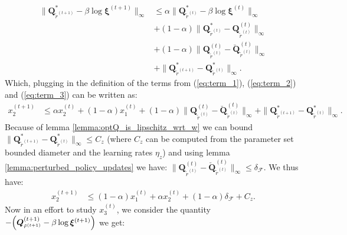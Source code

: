 \begin{align*}
    \| \bm{Q}_{\tilde{r}^{(t+1)}}^* - \beta \log \bm{\xi}^{(t+1)} \|_\infty
    & \leq \alpha  \| \bm{Q}_{\tilde{r}^{(t)}}^* - \beta \log \bm{\xi}^{(t)} \|_\infty 
    \\
    &+ (1-\alpha) \|
    \bm{Q}_{\tilde{r}^{(t)}}^*  
    - {\bm{Q}}^{(t)}_{\tilde{r}^{(t)}} 
    \|_\infty  
    \\ 
    &+ (1-\alpha) \|
        {\bm{Q}}^{(t)}_{\tilde{r}^{(t)}} 
        - \breve{\bm{Q}}^{(t)}_{\tilde{r}^{(t)}} 
    \|_\infty 
    \\
    &+ \| 
        \bm{Q}_{\tilde{r}^{(t+1)}}^*  
        - \bm{Q}_{\tilde{r}^{(t)}}^*  
    \|_\infty.
\end{align*}
Which, plugging in the definition of the terms from (\ref{eq:term_1}), (\ref{eq:term_2}) and (\ref{eq:term_3}) can be written as:
\begin{align*}
    x_2^{(t+1)} 
    & \leq \alpha x_2^{(t)}  
    + (1-\alpha) x_1^{(t)}
    + (1-\alpha) \|
        {\bm{Q}}^{(t)}_{\tilde{r}^{(t)}} 
        - \breve{\bm{Q}}^{(t)}_{\tilde{r}^{(t)}} 
    \|_\infty 
    + \| 
        \bm{Q}_{\tilde{r}^{(t+1)}}^*  
        - \bm{Q}_{\tilde{r}^{(t)}}^*  
    \|_\infty.
\end{align*}
Because of lemma \ref{lemma:optQ_is_lipschitz_wrt_w} we can bound $\| \bm{Q}_{\tilde{r}^{(t+1)}}^*- \bm{Q}_{\tilde{r}^{(t)}}^* \|_\infty \leq C_z$ (where $C_z$ can be computed from the parameter set bounded diameter and the learning rates $\eta_z$) and using lemma \ref{lemma:perturbed_policy_updates} we have: $\|{\bm{Q}}^{(t)}_{\tilde{r}^{(t)}} - \breve{\bm{Q}}^{(t)}_{\tilde{r}^{(t)}} \|_\infty \leq \delta_\mathcal{F}$. We thus have:
\begin{equation}
    \begin{aligned}
        \label{eq:ineq_opt_aux}
        x_2^{(t+1)} 
        & \leq (1-\alpha) x_1^{(t)} + \alpha x_2^{(t)}  
        + (1-\alpha) \delta_\mathcal{F} + C_z.
    \end{aligned}
\end{equation}
Now in an effort to study $x_3^{(t)}$, we consider the quantity  $- \Bigl( \bm{Q}_{\tilde{r}^{(t+1)}}^{(t+1)}  - \beta \log \bm{\xi}^{(t+1)} \Bigr) $ we get:
